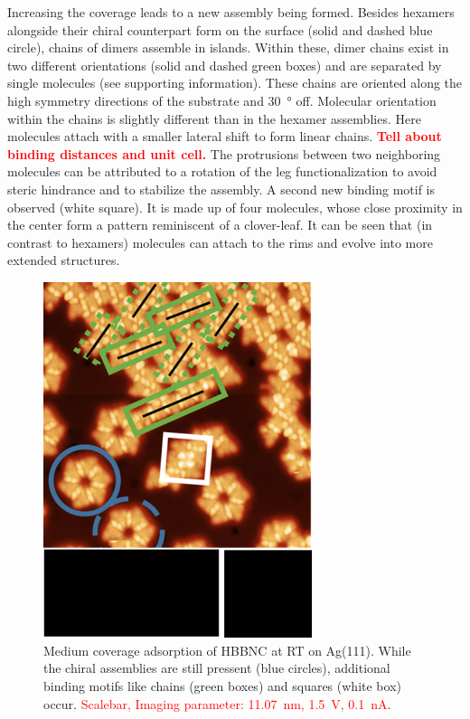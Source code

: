 Increasing the coverage leads to a new assembly being formed. Besides hexamers alongside their chiral counterpart form on the surface (solid and dashed blue circle), chains of dimers assemble in islands. Within these, dimer chains exist in two different orientations (solid and dashed green boxes) and are separated by single molecules (see supporting information). 
These chains are oriented along the high symmetry directions of the substrate and \SI{30}{\degree} off. Molecular orientation within the chains is slightly different than in the hexamer assemblies. Here molecules attach with a smaller lateral shift to form linear chains. 
\textbf{\textcolor{red}{Tell about binding distances and unit cell.}}
The protrusions between two neighboring molecules can be attributed to a rotation of the leg functionalization to avoid steric hindrance and to stabilize the assembly.
A second new binding motif is observed (white square).  It is made up of four molecules, whose close proximity in the center form a pattern reminiscent of a clover-leaf. It can be seen that (in contrast to hexamers) molecules can attach to the rims and evolve into more extended structures.

\begin{figure}[] \centering
	\includegraphics[width=0.7\textwidth]{./images/hbbnc-ag-111-rt-med-coverage}
	\caption{Medium coverage adsorption of HBBNC at RT on Ag(111). While the chiral assemblies are still pressent (blue circles), additional binding motifs like chains (green boxes) and squares (white box) occur. \textcolor{red}{Scalebar, Imaging parameter: \SI{11.07}{\nano \meter}, \SI{1.5}{\volt}, \SI{0.1}{\nano \ampere}}.}
	\label{}
\end{figure}

